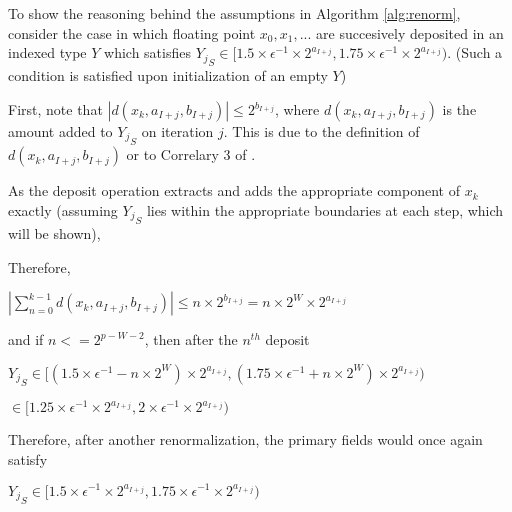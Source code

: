 \documentclass[12pt]{article}
\theoremstyle{plain}
\begin{document}
    To show the reasoning behind the assumptions in Algorithm \ref{alg:renorm}, consider the case in which floating point $x_0, x_1, ...$ are succesively deposited in an indexed type $Y$ which satisfies ${Y_j}_S \in [1.5 \times \epsilon^{-1}\times 2^{a_{I + j}}, 1.75 \times \epsilon^{-1}\times 2^{a_{I + j}})$. (Such a condition is satisfied upon initialization of an empty $Y$)

    First, note that $|d(x_k, a_{I + j}, b_{I + j})| \leq 2^{b_{I + j}}$, where $d(x_k, a_{I + j}, b_{I + j})$ is the amount added to ${Y_j}_S$ on iteration $j$. This is due to the definition of $d(x_k, a_{I+j}, b_{I + j})$ or to Correlary 3 of \cite{repsum}.

    As the deposit operation extracts and adds the appropriate component of $x_k$ exactly (assuming ${Y_j}_S$ lies within the appropriate boundaries at each step, which will be shown),

    Therefore,

    $|\sum \limits_{n = 0}^{k - 1} d(x_k, a_{I + j}, b_{I + j})| \leq n \times 2^{b_{I + j}} = n \times 2^{W} \times 2^{a_{I + j}}$

    and if $n <= 2^{p - W - 2}$, then after the $n^{th}$ deposit

    ${Y_j}_S \in [(1.5 \times \epsilon^{-1} - n \times 2^W)\times 2^{a_{I + j}}, (1.75 \times \epsilon^{-1} + n \times 2^W)\times 2^{a_{I + j}})$

    \indent\indent$\in [1.25 \times \epsilon^{-1}\times 2^{a_{I + j}}, 2 \times \epsilon^{-1}\times 2^{a_{I + j}})$

    Therefore, after another renormalization, the primary fields would once again satisfy

    ${Y_j}_S \in [1.5 \times \epsilon^{-1}\times 2^{a_{I + j}}, 1.75 \times \epsilon^{-1}\times 2^{a_{I + j}})$
\end{document}
